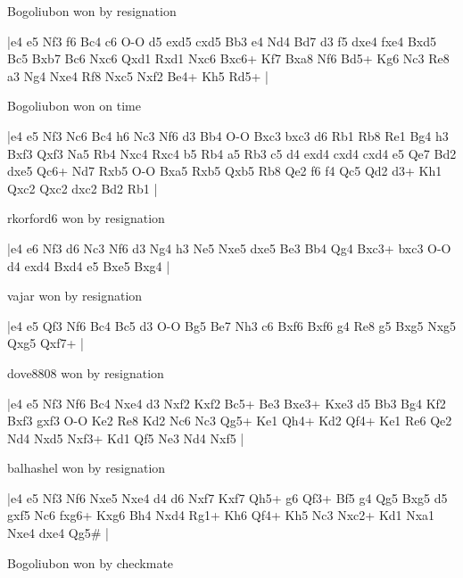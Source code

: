 Bogoliubon won by resignation

\makegametitle
|e4 e5 Nf3 f6 Bc4 c6 O-O d5 exd5 cxd5 Bb3 e4 Nd4 Bd7 d3 f5 dxe4 fxe4 Bxd5 Bc5 Bxb7 Bc6 Nxc6 Qxd1 Rxd1 Nxc6 Bxc6+ Kf7 Bxa8 Nf6 Bd5+ Kg6 Nc3 Re8 a3 Ng4 Nxe4 Rf8 Nxc5 Nxf2 Be4+ Kh5 Rd5+  |

\showboard

Bogoliubon won on time

\makegametitle
|e4 e5 Nf3 Nc6 Bc4 h6 Nc3 Nf6 d3 Bb4 O-O Bxc3 bxc3 d6 Rb1 Rb8 Re1 Bg4 h3 Bxf3 Qxf3 Na5 Rb4 Nxc4 Rxc4 b5 Rb4 a5 Rb3 c5 d4 exd4 cxd4 cxd4 e5 Qe7 Bd2 dxe5 Qc6+ Nd7 Rxb5 O-O Bxa5 Rxb5 Qxb5 Rb8 Qe2 f6 f4 Qc5 Qd2 d3+ Kh1 Qxc2 Qxc2 dxc2 Bd2 Rb1  |

\showboard

rkorford6 won by resignation

\makegametitle
|e4 e6 Nf3 d6 Nc3 Nf6 d3 Ng4 h3 Ne5 Nxe5 dxe5 Be3 Bb4 Qg4 Bxc3+ bxc3 O-O d4 exd4 Bxd4 e5 Bxe5 Bxg4  |

\showboard

vajar won by resignation

\makegametitle
|e4 e5 Qf3 Nf6 Bc4 Bc5 d3 O-O Bg5 Be7 Nh3 c6 Bxf6 Bxf6 g4 Re8 g5 Bxg5 Nxg5 Qxg5 Qxf7+  |

\showboard

dove8808 won by resignation

\makegametitle
|e4 e5 Nf3 Nf6 Bc4 Nxe4 d3 Nxf2 Kxf2 Bc5+ Be3 Bxe3+ Kxe3 d5 Bb3 Bg4 Kf2 Bxf3 gxf3 O-O Ke2 Re8 Kd2 Nc6 Nc3 Qg5+ Ke1 Qh4+ Kd2 Qf4+ Ke1 Re6 Qe2 Nd4 Nxd5 Nxf3+ Kd1 Qf5 Ne3 Nd4 Nxf5  |

\showboard

balhashel won by resignation

\makegametitle
|e4 e5 Nf3 Nf6 Nxe5 Nxe4 d4 d6 Nxf7 Kxf7 Qh5+ g6 Qf3+ Bf5 g4 Qg5 Bxg5 d5 gxf5 Nc6 fxg6+ Kxg6 Bh4 Nxd4 Rg1+ Kh6 Qf4+ Kh5 Nc3 Nxc2+ Kd1 Nxa1 Nxe4 dxe4 Qg5\#  |

\showboard

Bogoliubon won by checkmate


